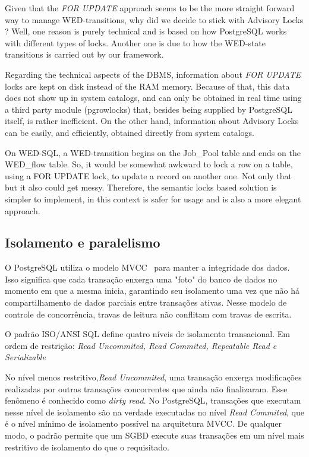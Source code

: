 \documentclass[conference]{IEEEtran}
\begin{document}
\par Given that the \emph{FOR UPDATE} approach seems to be the more straight forward way to manage WED-transitions, why
did we decide to stick with Advisory Locks ? Well, one reason is purely technical and is based on how PostgreSQL
works with different types of locks. Another one is due to how the WED-state transitions is carried out by our framework. 

\par Regarding the technical aspects of the DBMS, information about \emph{FOR UPDATE} locks are kept on disk instead of
the RAM memory. Because of that, this data does not show up in system catalogs, and can only be obtained in real time
using a third party module (pgrowlocks) that, besides being supplied by PostgreSQL itself, is rather inefficient. On the
other hand, information about Advisory Locks can be easily, and efficiently, obtained directly from system catalogs.  

\par On WED-SQL, a WED-transition begins on the Job\_Pool table and ends on the WED\_flow table. So, it would be somewhat
awkward to lock a row on a table, using a FOR UPDATE lock, to update a record on another one. Not only that but it also 
could get messy. Therefore, the semantic locks based solution is simpler to implement, in this context is safer for usage 
and is also a more elegant approach.   


\subsection{Isolamento e paralelismo}
O PostgreSQL utiliza o modelo MVCC~\cite{NAV} para manter a integridade dos dados. Isso significa que cada transação enxerga uma "foto"
do banco de dados no momento em que a mesma inicia, garantindo seu isolamento uma vez que não há compartilhamento de dados
parciais entre transações ativas. Nesse modelo de controle de concorrência, travas de leitura não conflitam com travas de escrita.

\par O padrão ISO/ANSI SQL define quatro níveis de isolamento transacional. Em ordem de restrição: \emph{
Read Uncommited, Read Commited, Repeatable Read e Serializable}

\par No nível menos restritivo,\emph{Read Uncommited}, uma transação enxerga modificações realizadas por outras transações
concorrentes que ainda não finalizaram. Esse fenômeno é conhecido como \emph{dirty read}. No PostgreSQL, transações que executam
nesse nível de isolamento são na verdade executadas no nível \emph{Read Commited}, que é o nível mínimo de isolamento possível
na arquitetura MVCC. De qualquer modo, o padrão permite que um SGBD execute suas transações em um nível mais restritivo
de isolamento do que o requisitado.
\end{document}
